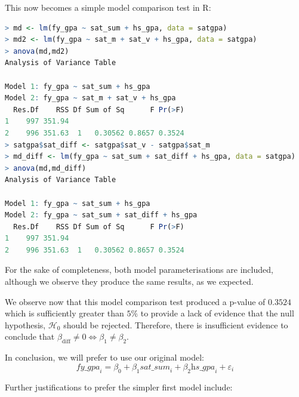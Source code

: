 \documentclass[]{article}
\begin{document}
\noindent This now becomes a simple model comparison test in \textsf{R}:
\begin{lstlisting}[language=R]
> md <- lm(fy_gpa ~ sat_sum + hs_gpa, data = satgpa)
> md2 <- lm(fy_gpa ~ sat_m + sat_v + hs_gpa, data = satgpa)
> anova(md,md2)
Analysis of Variance Table

Model 1: fy_gpa ~ sat_sum + hs_gpa
Model 2: fy_gpa ~ sat_m + sat_v + hs_gpa
  Res.Df    RSS Df Sum of Sq      F Pr(>F)
1    997 351.94                           
2    996 351.63  1   0.30562 0.8657 0.3524
> satgpa$sat_diff <- satgpa$sat_v - satgpa$sat_m
> md_diff <- lm(fy_gpa ~ sat_sum + sat_diff + hs_gpa, data = satgpa)
> anova(md,md_diff)
Analysis of Variance Table

Model 1: fy_gpa ~ sat_sum + hs_gpa
Model 2: fy_gpa ~ sat_sum + sat_diff + hs_gpa
  Res.Df    RSS Df Sum of Sq      F Pr(>F)
1    997 351.94                           
2    996 351.63  1   0.30562 0.8657 0.3524
\end{lstlisting}

\noindent For the sake of completeness, both model parameterisations are included, although we observe they produce the same results, as we expected.\newline

\noindent We observe now that this model comparison test produced a p-value of $0.3524$ which is sufficiently greater than $5\%$ to provide a lack of evidence that the null hypothesis, $\mathcal{H}_0$ should be rejected. Therefore, there is insufficient evidence to conclude that $\beta_{\text{diff}}\neq0 \iff \beta_1\neq\beta_2$. \newline

\noindent In conclusion, we will prefer to use our original model:
\[
\textit{fy\_gpa}_i = \beta_0 + \beta_1 \textit{sat\_sum}_i + \beta_2  \textit{hs\_gpa}_i + \varepsilon_i
\]


\noindent Further justifications to prefer the simpler first model include:
\end{document}
